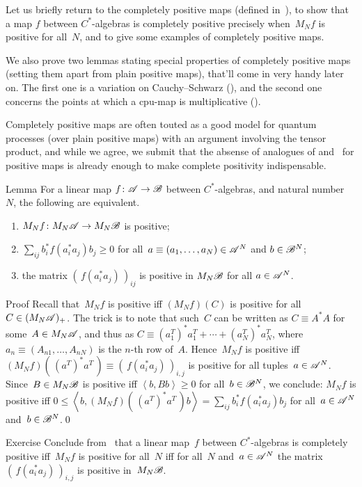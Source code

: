 \documentclass[a]{subfiles}
\begin{document}
\begin{parsec}%
\begin{point}%
Let us briefly return
to the completely positive maps (defined in~),
to show that a map $f$ between $C^*$-algebras
is completely positive precisely
when~$M_Nf$ is positive for all~$N$,
and to give some examples of completely positive maps.

We also prove two lemmas
stating special properties of completely positive maps (setting
them apart from plain positive maps),
that'll come in very handy later on.
The first one is a variation on Cauchy--Schwarz
(),
and the second one concerns
the points at which a cpu-map is multiplicative ().

Completely positive maps are often touted as 
a good model for quantum processes
(over plain positive maps)
with an argument involving the tensor product,
and while we agree,
we submit that the absense of analogues of  and~
for positive maps
is already enough to make complete positivity indispensable.
\end{point}
\begin{point}[n-pos]{Lemma}%
For a linear map $f\colon \mathscr{A}\to\mathscr{B}$
between $C^*$-algebras,
and natural number~$N$,
the following are equivalent.
\begin{enumerate}
\item
\label{n-pos-1}
$M_Nf\colon M_N\mathscr{A}\to M_N\mathscr{B}$
is positive;
\item
\label{n-pos-2}
	$\sum_{ij} b^*_if(a^*_ia_j)b_j \geq 0$
	for all~$a\equiv(a_1,\dotsc,a_N)\in \mathscr{A}^N$
	and $b\in \mathscr{B}^N$;
\item
\label{n-pos-3}
the matrix $(\,f(a_i^*a_j)\,)_{ij}$
is positive in $M_N\mathscr{B}$ for all $a\in\mathscr{A}^N$.
\end{enumerate}
\begin{point}{Proof}%
Recall that~$M_Nf$ is positive
iff $(M_Nf)(C)$ is positive for all $C\in (M_N\mathscr{A})_{+}$.
The trick is to note that such~$C$ can be written as $C\equiv A^*A$
for some~$A\in M_N\mathscr{A}$,
and thus as $C \equiv (a_1^T)^* a_1^T+\dotsb+(a_N^T)^*a_N^T$,
where $a_n\equiv(A_{n1},\dotsc,A_{nN})$ is the $n$-th row of~$A$.
Hence~$M_Nf$ is positive
iff $(M_Nf)(\,(a^T)^*a^T\, )\equiv(\,f(a_i^*a_j)\,)_{i,j}$ is positive
for all tuples~$a\in\mathscr{A}^N$.
Since~$B\in M_N\mathscr{B}$ is positive iff $\left<b,Bb\right>\geq 0$
for all~$b\in \mathscr{B}^N$,
we conclude:
$M_Nf$ is positive iff 
$0\leq\left<b,(M_Nf)(\, (a^T)^*a^T\,) b\right>
= \sum_{ij} b_i^*f(a_i^*a_j)b_j$
for all~$a\in\mathscr{A}^N$ and~$b\in\mathscr{B}^N$.\qed
\end{point}
\end{point}
\begin{point}[cp]{Exercise}%
Conclude from~
that a linear map~$f$ between $C^*$-algebras
is completely positive iff~$M_Nf$ is positive for all~$N$
iff 
for all~$N$ and~$a\in \mathscr{A}^N$
the matrix $(\,f(a_i^*a_j)\,)_{i,j}$ 
is positive in~$M_N\mathscr{B}$.


\end{point}
\end{parsec}
\end{document}

